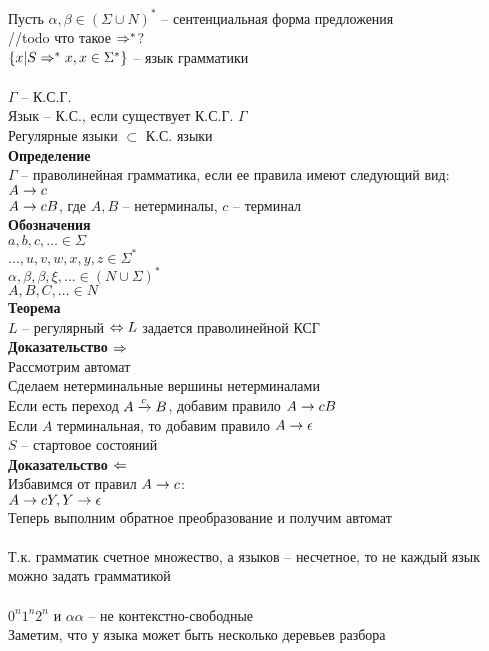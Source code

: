 \documentclass[12pt]{article}
\begin{document}
Пусть $\alpha, \beta \in (\Sigma\cup N)^*$ -- сентенциальная форма предложения\\
//todo что такое $\Rightarrow^*$?\\
$\{x|S\Rightarrow^* x, x \in \Sigma^*\}$ -- язык грамматики\\\\
$\Gamma$ -- К.С.Г.\\
Язык -- К.С., если существует К.С.Г. $\Gamma$\\
Регулярные языки $\subset$ К.С. языки\\
\textbf{Определение}\\
$\Gamma$ -- праволинейная грамматика, если ее правила имеют следующий вид:\\
$A \rightarrow c$\\
$A \rightarrow cB$, где $A,B$ -- нетерминалы, $c$ -- терминал\\
\textbf{Обозначения}\\
$a,b,c,\ldots \in \Sigma$\\
$\ldots, u, v, w, x, y, z \in \Sigma^*$\\
$\alpha, \beta, \beta, \xi, \ldots \in (N\cup \Sigma)^*$\\
$A, B, C, \ldots \in N$\\
\textbf{Теорема}\\
$L$ -- регулярный $\Leftrightarrow L$ задается праволинейной КСГ\\
\textbf{Доказательство $\Rightarrow$}\\
Рассмотрим автомат\\
Сделаем нетерминальные вершины нетерминалами\\
Если есть переход $A \xrightarrow{c} B$, добавим правило $A \rightarrow cB$\\
Если $A$ терминальная, то добавим правило $A \rightarrow \epsilon$\\
$S$ -- стартовое состояний\\
\textbf{Доказательство $\Leftarrow$}\\
Избавимся от правил $A \rightarrow c$:\\
$A \rightarrow cY, Y \rightarrow \epsilon$\\
Теперь выполним обратное преобразование и получим автомат\\\\
Т.к. грамматик счетное множество, а языков -- несчетное, то не каждый язык можно задать грамматикой\\\\
$0^n1^n2^n$ и $\alpha\alpha$ -- не контекстно-свободные\\
Заметим, что у языка может быть несколько деревьев разбора\\
\end{document}
